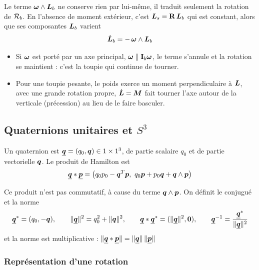 \begin{remarque}
    Le terme $\bm{\omega}\wedge\bm{L}_b$ ne conserve rien par
    lui-même, il traduit seulement la rotation de $\mathcal{R}_{b}$. En
    l'absence de moment extérieur, c'est $\bm{L}_s = \mathbf{R}\,
    \bm{L}_b$ qui est constant, alors que ses composantes
    $\bm{L}_b$ varient
    \[
        \dot{\bm{L}}_b = -\,\bm{\omega}\wedge\bm{L}_b
    \]
    \begin{itemize}
        \item Si $\bm{\omega}$ est porté par un axe principal,
            $\bm{\omega}\parallel\mathbf{I}_b\bm{\omega}$, le terme
            s'annule et la rotation se maintient : c'est la toupie qui
            continue de tourner.
        \item Pour une toupie pesante, le poids exerce un moment
            perpendiculaire à $\bm{L}$, avec une grande rotation
            propre, $\dot{\bm{L}} = \bm{M}$ fait tourner l'axe
            autour de la verticale (précession) au lieu de le faire
            basculer.
    \end{itemize}
\end{remarque}

\subsection{Quaternions unitaires et \texorpdfstring{$S^3$}{S3}}

\begin{definition}[Quaternion]
    Un quaternion est $\underline{\bm{q}} = (q_0,\bm{q})\in1\times1^3$, de
    partie scalaire $q_0$ et de partie vectorielle $\bm{q}$. Le
    produit de Hamilton est
    \[
        \underline{\bm{q}}\ast\underline{\bm{p}}
        = \bigl(q_0p_0 - \bm{q}^T\bm{p},\
        q_0\bm{p} + p_0\bm{q} + \bm{q}\wedge\bm{p}\bigr)
    \]
\end{definition}

Ce produit n'est pas commutatif, à cause du terme
$\bm{q}\wedge\bm{p}$. On définit le conjugué et la norme
\[
    \underline{\bm{q}}^* = (q_0,-\bm{q}),
    \qquad
    \|\underline{\bm{q}}\|^2 = q_0^2 + \|\bm{q}\|^2,
    \qquad
    \underline{\bm{q}}\ast\underline{\bm{q}}^* = (\|\underline{\bm{q}}\|^2,\bm{0}),
    \qquad
    \underline{\bm{q}}^{-1} = \frac{\underline{\bm{q}}^*}{\|\underline{\bm{q}}\|^2}
\]
et la norme est multiplicative : $\|\underline{\bm{q}}\ast\underline{\bm{p}}\|
= \|\underline{\bm{q}}\|\,\|\underline{\bm{p}}\|$

\subsubsection{Représentation d'une rotation}


